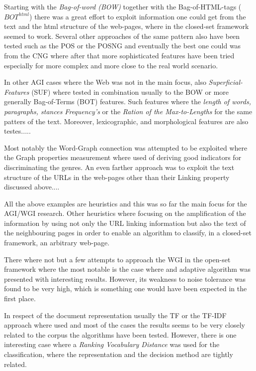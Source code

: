 \documentclass[
    11pt, %
    english, %
    singlespacing, %
    headsepline, %
]{DoctoralThesis} %
\begin{document}
Starting with the \textit{Bag-of-word (BOW)} together with the Bag-of-HTML-tags ($BOT^{html}$) there was a great effort to exploit information one could get from the text and the html structure of the web-pages, where in the closed-set framework seemed to work. Several other approaches of the same pattern also have been tested such as the POS or the POSNG and eventually the best one could was from the CNG where after that more sophisticated features have been tried especially for more complex and more close to the real world scenario.

In other AGI cases where the Web was not in the main focus, also \textit{Superficial-Features} (SUF) where tested in combination usually to the BOW or more generally Bag-of-Terms (BOT) features. Such features where the \textit{length of words, paragraphs, stances Frequency's} or the \textit{Ration of the Max-to-Lengths} for the same patters of the text. Moreover, lexicographic, and morphological features are also testes.....

Most notably the Word-Graph connection was attempted to be exploited where the Graph properties measurement where used of  deriving good indicators for discriminating the genres. An even farther approach was to exploit the text structure of the URLs in the web-pages other than their Linking property discussed above....

All the above examples are heuristics and this was so far the main focus for the AGI/WGI research. Other heuristics where focusing on the amplification of the information by using not only the URL linking information but also the text of the neighbouring pages in order to enable an algorithm to classify, in a closed-set framework, an arbitrary web-page. 

There where not but a few attempts to approach the WGI in the open-set framework where the most notable is the case where and adaptive algorithm was presented with interesting results. However, its weakness to noise tolerance was found to be very high, which is something one would have been expected in the first place. 

In respect of the document representation usually the TF or the TF-IDF approach where used and most of the cases the results seems to be very closely related to the corpus the algorithms have been tested. However, there is one interesting case where a \textit{Ranking Vocabulary Distance} was used for the classification, where the representation and the decision method are tightly related.
 
\end{document}
